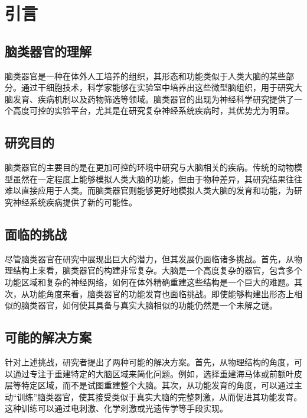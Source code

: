 \chapter{引言}\label{chap:introduction}

\section{脑类器官的理解}\label{sec:brain-organoid}
脑类器官是一种在体外人工培养的组织，其形态和功能类似于人类大脑的某些部分\cite{Kim2023}。通过干细胞技术，科学家能够在实验室中培养出这些微型脑组织，用于研究大脑发育、疾病机制以及药物筛选等领域。脑类器官的出现为神经科学研究提供了一个高度可控的实验平台，尤其是在研究复杂神经系统疾病时，其优势尤为明显。

\section{研究目的}\label{sec:research-purpose}
脑类器官的主要目的是在更加可控的环境中研究与大脑相关的疾病。传统的动物模型虽然在一定程度上能够模拟人类大脑的功能，但由于物种差异，其研究结果往往难以直接应用于人类。而脑类器官则能够更好地模拟人类大脑的发育和功能，为研究神经系统疾病提供了新的可能性。

\section{面临的挑战}\label{sec:research-challenges}
尽管脑类器官在研究中展现出巨大的潜力，但其发展仍面临诸多挑战。首先，从物理结构上来看，脑类器官的构建非常复杂。大脑是一个高度复杂的器官，包含多个功能区域和复杂的神经网络，如何在体外精确重建这些结构是一个巨大的难题。其次，从功能角度来看，脑类器官的功能发育也面临挑战。即使能够构建出形态上相似的脑类器官，如何使其具备与真实大脑相似的功能仍然是一个未解之谜。

\section{可能的解决方案}\label{sec:research-solutions}
针对上述挑战，研究者提出了两种可能的解决方案。首先，从物理结构的角度，可以通过专注于重建特定的大脑区域来简化问题。例如，选择重建海马体或前额叶皮层等特定区域，而不是试图重建整个大脑。其次，从功能发育的角度，可以通过主动“训练”脑类器官，使其接受类似于真实大脑的完整刺激，从而促进其功能发育。这种训练可以通过电刺激、化学刺激或光遗传学等手段实现。

